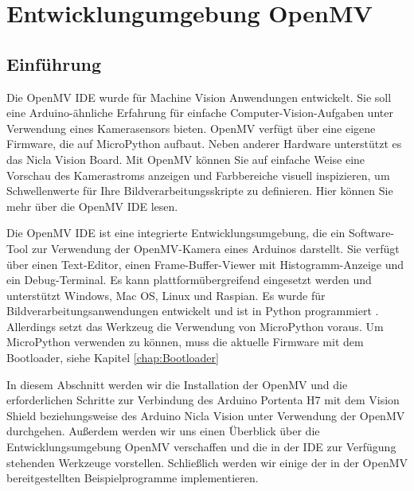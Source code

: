 %
%




\chapter{Entwicklungumgebung OpenMV}


\section{Einführung}



Die OpenMV IDE wurde für Machine Vision Anwendungen entwickelt. Sie soll eine Arduino-ähnliche Erfahrung für einfache Computer-Vision-Aufgaben unter Verwendung eines Kamerasensors bieten. OpenMV verfügt über eine eigene Firmware, die auf MicroPython aufbaut. Neben anderer Hardware unterstützt es das Nicla Vision Board. Mit OpenMV können Sie auf einfache Weise eine Vorschau des Kamerastroms anzeigen und Farbbereiche visuell inspizieren, um Schwellenwerte für Ihre Bildverarbeitungsskripte zu definieren. Hier können Sie mehr über die OpenMV IDE lesen.




Die OpenMV IDE ist eine  integrierte Entwicklungsumgebung, die ein Software-Tool zur Verwendung der OpenMV-Kamera eines Arduinos darstellt.  Sie verfügt über einen Text-Editor, einen Frame-Buffer-Viewer mit Histogramm-Anzeige und ein Debug-Terminal. Es kann plattformübergreifend eingesetzt werden und unterstützt Windows, Mac OS, Linux und Raspian. Es wurde für Bildverarbeitungsanwendungen entwickelt und ist in Python programmiert \cite{OpenMV:2021}.  Allerdings setzt das Werkzeug die Verwendung von MicroPython voraus.   Um MicroPython verwenden zu können, muss die aktuelle Firmware mit dem Bootloader, siehe Kapitel \autoref{chap:Bootloader}


\bigskip

In diesem Abschnitt werden wir die Installation der OpenMV und die erforderlichen Schritte zur Verbindung des Arduino Portenta H7  mit dem Vision Shield beziehungsweise des Arduino Nicla Vision unter Verwendung der OpenMV durchgehen. Außerdem werden wir uns einen Überblick über die Entwicklungsumgebung OpenMV verschaffen und die in der IDE zur Verfügung stehenden Werkzeuge vorstellen.  Schließlich werden wir einige der in der OpenMV bereitgestellten Beispielprogramme implementieren.

